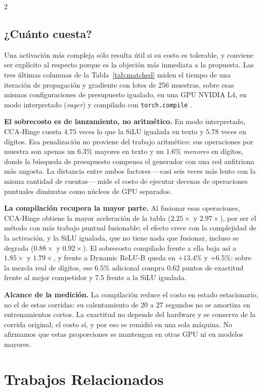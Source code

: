 \begin{multicols}{2}
\subsection{¿Cuánto cuesta?}

Una activación más compleja sólo resulta útil si su costo es tolerable, y conviene ser explícito al respecto porque es la objeción más inmediata a la propuesta. Las tres últimas columnas de la Tabla~\ref{tab:matched} miden el tiempo de una iteración de propagación y gradiente con lotes de 256 muestras, sobre esas mismas configuraciones de presupuesto igualado, en una GPU NVIDIA L4, en modo interpretado (\textit{eager}) y compilado con \texttt{torch.compile} \cite{ansel2024pytorch2}.

\textbf{El sobrecosto es de lanzamiento, no aritmético.} En modo interpretado, CCA-Hinge cuesta $4.75$ veces lo que la SiLU igualada en texto y $5.78$ veces en dígitos. Esa penalización no proviene del trabajo aritmético: sus operaciones por muestra son apenas un $6.3\%$ mayores en texto y un $1.6\%$ \textit{menores} en dígitos, donde la búsqueda de presupuesto compensa el generador con una red anfitriona más angosta. La distancia entre ambos factores —casi seis veces más lento con la misma cantidad de cuentas— mide el costo de ejecutar decenas de operaciones puntuales diminutas como núcleos de GPU separados.

\textbf{La compilación recupera la mayor parte.} Al fusionar esas operaciones, CCA-Hinge obtiene la mayor aceleración de la tabla ($2.25\times$ y $2.97\times$), por ser el método con más trabajo puntual fusionable; el efecto crece con la complejidad de la activación, y la SiLU igualada, que no tiene nada que fusionar, incluso se degrada ($0.88\times$ y $0.92\times$). El sobrecosto compilado frente a ella baja así a $1.85\times$ y $1.79\times$, y frente a Dynamic ReLU-B queda en $+13.4\%$ y $+6.5\%$: sobre la mezcla real de dígitos, ese $6.5\%$ adicional compra $0.62$ puntos de exactitud frente al mejor competidor y $7.5$ frente a la SiLU igualada.

\textbf{Alcance de la medición.} La compilación reduce el costo en estado estacionario, no el de estas corridas: su calentamiento de 20 a 27 segundos no se amortiza en entrenamientos cortos. La exactitud no depende del hardware y se conserva de la corrida original; el costo sí, y por eso se remidió en una sola máquina. No afirmamos que estas proporciones se mantengan en otras GPU ni en modelos mayores.

\section{Trabajos Relacionados}


\end{multicols}
